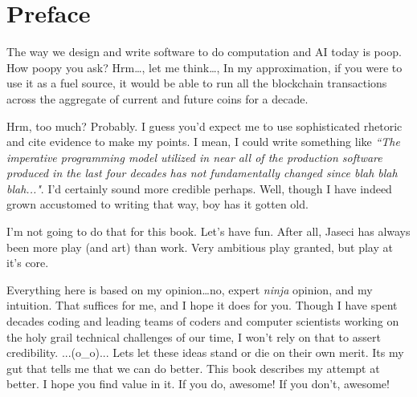 \chapter*{Preface}

The way we design and write software to do computation and AI today is poop. How poopy you ask? Hrm\dots, let me think\dots, In my approximation, if you were to use it as a fuel source, it would be able to run all the blockchain transactions across the aggregate of current and future coins for a decade.
\par
Hrm, too much? Probably. I guess you'd expect me to use sophisticated rhetoric and cite evidence to make my points. I mean, I could write something like \textit{``The imperative programming model utilized in near all of the production software produced in the last four decades has not fundamentally changed since blah blah blah..."}. I'd certainly sound more credible perhaps. Well, though I have indeed grown accustomed to writing that way, boy has it gotten old.
\par
I'm not going to do that for this book. Let's have fun. After all, Jaseci has always been more play (and art) than work. Very ambitious play granted, but play at it's core.
\par
Everything here is based on my opinion\dots no, expert \emph{ninja} opinion, and my intuition. That suffices for me, and I hope it does for you. Though I have spent decades coding and leading teams of coders and computer scientists working on the holy grail technical challenges of our time, I won't rely on that to assert credibility. ...(o\_o)... Lets let these ideas stand or die on their own merit. Its my gut that tells me that we can do better. This book describes my attempt at better. I hope you find value in it. If you do, awesome! If you don't, awesome!
